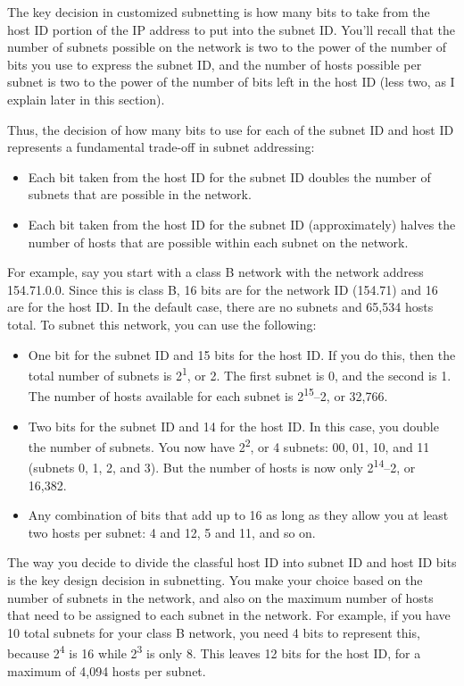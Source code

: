 The key decision in customized subnetting is how many bits to take from
the host ID portion of the
\protect\hypertarget{ch18s05.htmlux5cux23idx-CHP-18-0737}{}{}IP address
to put into the subnet ID. You'll recall that the number of subnets
possible on the network is two to the power of the number of bits you
use to express the subnet ID, and the number of hosts possible per
subnet is two to the power of the number of bits left in the host ID
(less two, as I explain later in this section).

Thus, the decision of how many bits to use for each of the subnet ID and
host ID represents a fundamental trade-off in subnet addressing:

\begin{itemize}
\item
  Each bit taken from the host ID for the subnet ID doubles the number
  of subnets that are possible in the network.
\item
  Each bit taken from the host ID for the subnet ID (approximately)
  halves the number of hosts that are possible within each subnet on the
  network.
\end{itemize}

For example, say you start with a class B network with the network
address 154.71.0.0. Since this is class B, 16 bits are for the network
ID (154.71) and 16 are for the host ID. In the default case, there are
no subnets and 65,534 hosts total. To subnet this network, you can use
the following:

\begin{itemize}
\item
  One bit for the subnet ID and 15 bits for the host ID. If you do this,
  then the total number of subnets is 2\textsuperscript{1}, or 2. The
  first subnet is 0, and the second is 1. The number of hosts available
  for each subnet is 2\textsuperscript{15}--2, or 32,766.
\item
  Two bits for the subnet ID and 14 for the host ID. In this case, you
  double the number of subnets. You now have 2\textsuperscript{2}, or 4
  subnets: 00, 01, 10, and 11 (subnets 0, 1, 2, and 3). But the number
  of hosts is now only 2\textsuperscript{14}--2, or 16,382.
\item
  Any combination of bits that add up to 16 as long as they allow you at
  least two hosts per subnet: 4 and 12, 5 and 11, and so on.
\end{itemize}

The way you decide to divide the classful host ID into subnet ID and
host ID bits is the key design decision in subnetting. You make your
choice based on the number of subnets in the network, and also on the
maximum number of hosts that need to be assigned to each subnet in the
network. For example, if you have 10 total subnets for your class B
network, you need 4 bits to represent this, because 2\textsuperscript{4}
is 16 while 2\textsuperscript{3} is only 8. This leaves 12 bits for the
host ID, for a maximum of 4,094 hosts per subnet.

